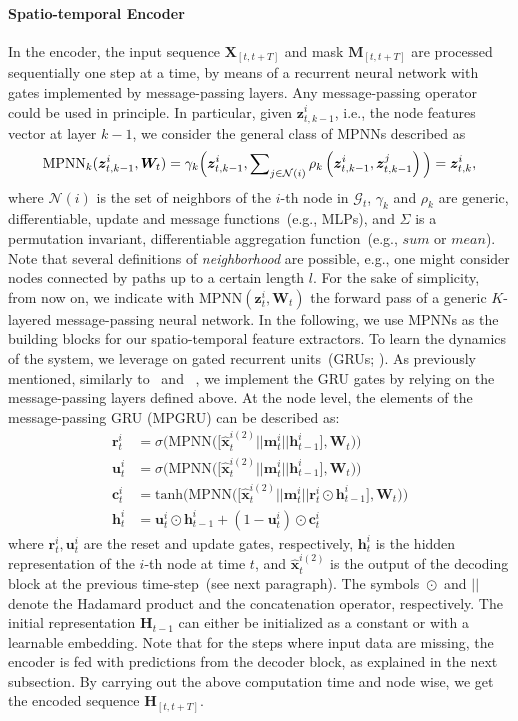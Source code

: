 \documentclass{article} \usepackage{iclr2022_conference,times}
\def\vc{{\bm{c}}}
\def\vh{{\bm{h}}}
\def\vm{{\bm{m}}}
\def\vr{{\bm{r}}}
\def\vu{{\bm{u}}}
\def\vx{{\bm{x}}}
\def\vz{{\bm{z}}}
\def\mH{{\bm{H}}}
\def\mM{{\bm{M}}}
\def\mW{{\bm{W}}}
\def\mX{{\bm{X}}}
\def\gG{{\mathcal{G}}}
\def\gN{{\mathcal{N}}}
\begin{document}
\paragraph{Spatio-temporal Encoder} In the encoder, the input sequence $\mX_{[t,t+T]}$ and mask $\mM_{[t,t+T]}$ are processed sequentially one step at a time, by means of a recurrent neural network with gates implemented by message-passing layers. 
Any message-passing operator could be used in principle. In particular, given $\vz^i_{t, k-1}$, i.e., the node features vector at layer $k-1$,  we consider the general class of MPNNs described as
\begin{equation}
    \text{MPNN}_k(\vz^i_{t, k-1}, \mW_t) = \gamma_{k} \Big( \vz^i_{t, k-1}, \footnotesize{\sum}_{j \in \gN(i)} \, \rho_{k}\left(\vz^i_{t, k-1}, \vz^j_{t, k-1}\right) \Big) = \vz^i_{t, k},
\end{equation}
where $\gN(i)$ is the set of neighbors of the $i$-th node in $\gG_t$, $\gamma_{k}$ and $\rho_{k}$ are generic, differentiable, update and message functions~(e.g., MLPs), and $\Sigma$ is a permutation invariant, differentiable aggregation function~(e.g., $sum$ or $mean$). Note that several definitions of \emph{neighborhood} are possible, e.g., one might consider nodes connected by paths up to a certain length $l$. For the sake of simplicity, from now on, we indicate with MPNN$(\vz^i_t, \mW_t)$ the forward pass of a generic $K$-layered message-passing neural network.
In the following, we use MPNNs as the building blocks for our spatio-temporal feature extractors.
To learn the dynamics of the system, we leverage on gated recurrent units~(GRUs; \citealp{cho2014learning}). As previously mentioned, similarly to~\citet{seo2018structured} and ~\citet{li2018diffusion}, we implement the GRU gates by relying on the message-passing layers defined above. At the node level, the elements of the message-passing GRU (MPGRU) can be described as:
\begin{align}\label{eq:mpgrub}
    \vr_t^i &= \sigma\big( \text{MPNN}\big( \big[ \hat \vx_t^{i(2)} || \vm_t^i || \vh_{t-1}^i \big], \mW_t \big) \big) \\
    \vu_t^i &= \sigma\big( \text{MPNN}\big( \big[ \hat \vx_t^{i(2)} || \vm_t^i || \vh_{t-1}^i \big], \mW_t \big) \big) \\
    \vc_t^i &= \text{tanh}\big( \text{MPNN}\big( \big[ \hat \vx_t^{i(2)} || \vm_t^i || \vr_t^i \odot \vh_{t-1}^i \big], \mW_t \big) \big) \\
    \vh_t^i &= \vu_t^i \odot \vh_{t-1}^i + (1 - \vu_t^i) \odot \vc_t^i\label{eq:mpgrue}
\end{align}
where $\vr_t^i, \vu_t^i$ are the reset and update gates, respectively, $\vh_t^i$ is the hidden representation of the $i$-th node at time $t$, and $\hat \vx_t^{i(2)}$ is the output of the decoding block at the previous time-step~(see next paragraph). The symbols ${}\odot{}$ and $||$ denote the Hadamard product and the concatenation operator, respectively. The initial representation $\mH_{t-1}$ can either be initialized as a constant or with a learnable embedding. Note that for the steps where input data are missing, the encoder is fed with predictions from the decoder block, as explained in the next subsection. By carrying out the above computation time and node wise, we get the encoded sequence $\mH_{[t, t+T]}$.
\end{document}
